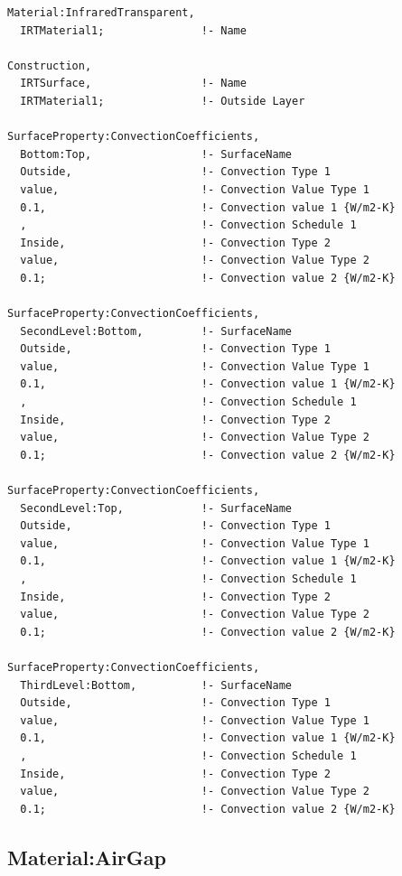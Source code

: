 \begin{lstlisting}
Material:InfraredTransparent,
  IRTMaterial1;               !- Name

Construction,
  IRTSurface,                 !- Name
  IRTMaterial1;               !- Outside Layer

SurfaceProperty:ConvectionCoefficients,
  Bottom:Top,                 !- SurfaceName
  Outside,                    !- Convection Type 1
  value,                      !- Convection Value Type 1
  0.1,                        !- Convection value 1 {W/m2-K}
  ,                           !- Convection Schedule 1
  Inside,                     !- Convection Type 2
  value,                      !- Convection Value Type 2
  0.1;                        !- Convection value 2 {W/m2-K}

SurfaceProperty:ConvectionCoefficients,
  SecondLevel:Bottom,         !- SurfaceName
  Outside,                    !- Convection Type 1
  value,                      !- Convection Value Type 1
  0.1,                        !- Convection value 1 {W/m2-K}
  ,                           !- Convection Schedule 1
  Inside,                     !- Convection Type 2
  value,                      !- Convection Value Type 2
  0.1;                        !- Convection value 2 {W/m2-K}

SurfaceProperty:ConvectionCoefficients,
  SecondLevel:Top,            !- SurfaceName
  Outside,                    !- Convection Type 1
  value,                      !- Convection Value Type 1
  0.1,                        !- Convection value 1 {W/m2-K}
  ,                           !- Convection Schedule 1
  Inside,                     !- Convection Type 2
  value,                      !- Convection Value Type 2
  0.1;                        !- Convection value 2 {W/m2-K}

SurfaceProperty:ConvectionCoefficients,
  ThirdLevel:Bottom,          !- SurfaceName
  Outside,                    !- Convection Type 1
  value,                      !- Convection Value Type 1
  0.1,                        !- Convection value 1 {W/m2-K}
  ,                           !- Convection Schedule 1
  Inside,                     !- Convection Type 2
  value,                      !- Convection Value Type 2
  0.1;                        !- Convection value 2 {W/m2-K}
\end{lstlisting}

\subsection{Material:AirGap}\label{materialairgap}

